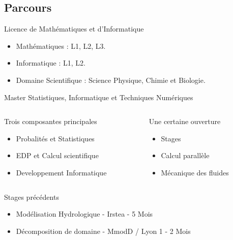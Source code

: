 \documentclass{beamer}
\begin{document}
\subsection{Parcours} 
\begin{frame}
\begin{block}{Licence de Mathématiques et d'Informatique}
\begin{itemize}
\item Mathématiques : L1, L2, L3.
\item Informatique : L1, L2.
\item Domaine Scientifique : Science Physique, Chimie et Biologie.
\end{itemize}
\end{block}

\begin{block}{Master Statistiques, Informatique et Techniques Numériques}
\begin{columns}[t]

\begin{column}{5.5cm}
Trois composantes principales
\begin{itemize}
\item Probalités et Statistiques 
\item EDP et Calcul scientifique
\item Developpement Informatique
\end{itemize}
\end{column}

\begin{column}{4.5cm}
Une certaine ouverture  
\begin{itemize}
\item \alert{Stages}
\item Calcul parallèle
\item Mécanique des fluides
\end{itemize}
\end{column}
\end{columns}  
\end{block}

\begin{block}{Stages précédents}
\begin{itemize}
\item Modélisation Hydrologique - Irstea - 5 Mois
\item Décomposition de domaine - MmodD / Lyon 1 - 2 Mois
\end{itemize}
\end{block}

\end{frame}
\end{document}
